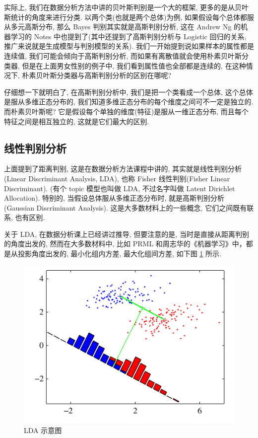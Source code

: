 \documentclass[a4paper,UTF8]{ctexart}
\theoremstyle{plain} \newtheorem{theorem}{定理}[section]
\theoremstyle{plain} \newtheorem{definition}{定义}[section]
\theoremstyle{plain} \newtheorem{lemma}{引理}[section]
\theoremstyle{plain} \newtheorem{proposition}{命题}[section]
\theoremstyle{plain} \newtheorem{example}{例}[section]
\theoremstyle{plain} \newtheorem{remark}{注}[section]
\theoremstyle{plain} \newtheorem{corollary}{推论}[section]
\begin{document}
实际上, 我们在数据分析方法中讲的贝叶斯判别是一个大的框架, 更多的是从贝叶斯统计的角度来进行分类. 以两个类(也就是两个总体)为例, 如果假设每个总体都服从多元高斯分布, 那么 Bayes 判别其实就是高斯判别分析, 这在 Andrew Ng 的机器学习的 Notes 中也提到了(其中还提到了高斯判别分析与 Logistic 回归的关系, 推广来说就是生成模型与判别模型的关系). 我们一开始提到说如果样本的属性都是连续值, 我们可能会倾向于高斯判别分析, 而如果有离散值就会使用朴素贝叶斯分类器, 但是在上面男女性别的例子中, 我们看到属性值也全部都是连续的, 在这种情况下, 朴素贝叶斯分类器与高斯判别分析的区别在哪呢?

仔细想一下就明白了, 在高斯判别分析中, 我们是把一个类看成一个总体, 这个总体是服从多维正态分布的, 我们知道多维正态分布的每个维度之间可不一定是独立的. 而朴素贝叶斯呢? 它是假设每个单独的维度(特征)是服从一维正态分布, 而且每个特征之间是相互独立的, 这就是它们最大的区别.


\subsection{线性判别分析}
上面提到了距离判别, 这是在数据分析方法课程中讲的, 其实就是线性判别分析(Linear Discriminant Analysis, LDA), 也称 Fisher 线性判别(Fisher Linear Discriminant). (有个 topic 模型也叫做 LDA, 不过名字叫做 Latent Dirichlet Allocation). 
特别的, 当假设总体服从多维正态分布时, 就是高斯判别分析(Gaussian Discriminant Analysis). 这是大多数材料上的一些概念, 它们之间既有联系, 也有区别.

关于 LDA, 在数据分析课上已经讲过推导, 但要注意的是, 当时是直接从距离判别的角度出发的, 然而在大多数材料中, 比如 PRML 和周志华的《机器学习》中，都是从投影角度出发的, 最小化组内方差, 最大化组间方差, 如下图 \ref{fig:lda} 所示.
\begin{figure}[!htb]
    \centering
    \includegraphics[width = 0.85 \textwidth]{lda-fig.pdf}
    \caption{LDA 示意图}
    \label{fig:lda}
\end{figure}
\end{document}
